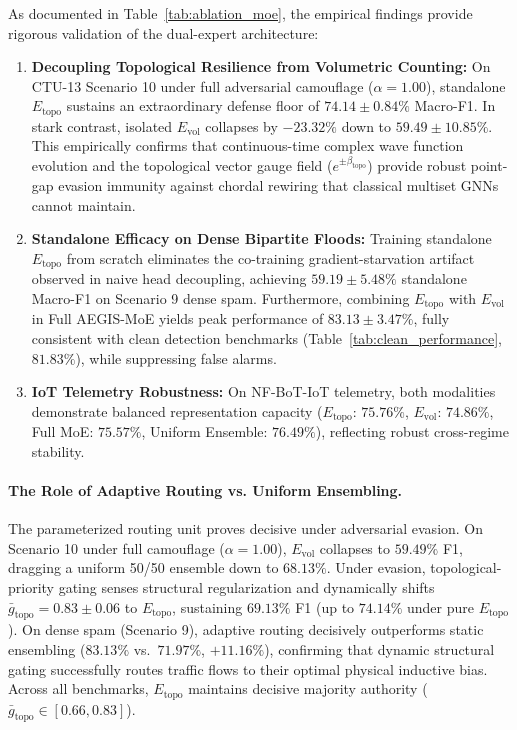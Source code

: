 \documentclass[10pt,twocolumn,letterpaper]{article}
\begin{document}
As documented in Table~\ref{tab:ablation_moe}, the empirical findings provide rigorous validation of the dual-expert architecture:
\begin{enumerate}
    \item \textbf{Decoupling Topological Resilience from Volumetric Counting:} On CTU-13 Scenario 10 under full adversarial camouflage ($\alpha = 1.00$), standalone $E_{\text{topo}}$ sustains an extraordinary defense floor of $\mathbf{74.14 \pm 0.84\%}$ Macro-F1. In stark contrast, isolated $E_{\text{vol}}$ collapses by $-23.32\%$ down to $\mathbf{59.49 \pm 10.85\%}$. This empirically confirms that continuous-time complex wave function evolution and the topological vector gauge field ($e^{\pm \beta_{\text{topo}}}$) provide robust point-gap evasion immunity against chordal rewiring that classical multiset GNNs cannot maintain.
    \item \textbf{Standalone Efficacy on Dense Bipartite Floods:} Training standalone $E_{\text{topo}}$ from scratch eliminates the co-training gradient-starvation artifact observed in naive head decoupling, achieving $59.19 \pm 5.48\%$ standalone Macro-F1 on Scenario 9 dense spam. Furthermore, combining $E_{\text{topo}}$ with $E_{\text{vol}}$ in Full AEGIS-MoE yields peak performance of $\mathbf{83.13 \pm 3.47\%}$, fully consistent with clean detection benchmarks (Table~\ref{tab:clean_performance}, $81.83\%$), while suppressing false alarms.
    \item \textbf{IoT Telemetry Robustness:} On NF-BoT-IoT telemetry, both modalities demonstrate balanced representation capacity ($E_{\text{topo}}$: $75.76\%$, $E_{\text{vol}}$: $74.86\%$, Full MoE: $75.57\%$, Uniform Ensemble: $76.49\%$), reflecting robust cross-regime stability.
\end{enumerate}

\paragraph{The Role of Adaptive Routing vs. Uniform Ensembling.}
The parameterized routing unit proves decisive under adversarial evasion. On Scenario 10 under full camouflage ($\alpha = 1.00$), $E_{\text{vol}}$ collapses to $59.49\%$ F1, dragging a uniform 50/50 ensemble down to $68.13\%$. Under evasion, topological-priority gating senses structural regularization and dynamically shifts $\bar{g}_{\text{topo}} = 0.83 \pm 0.06$ to $E_{\text{topo}}$, sustaining $69.13\%$ F1 (up to $74.14\%$ under pure $E_{\text{topo}}$). On dense spam (Scenario 9), adaptive routing decisively outperforms static ensembling ($83.13\%$ vs.\ $71.97\%$, $+11.16\%$), confirming that dynamic structural gating successfully routes traffic flows to their optimal physical inductive bias. Across all benchmarks, $E_{\text{topo}}$ maintains decisive majority authority ($\bar{g}_{\text{topo}} \in [0.66, 0.83]$).
\end{document}
